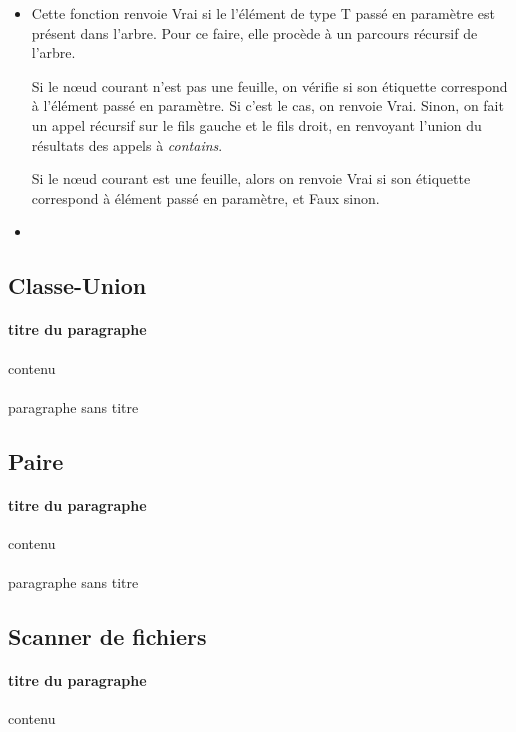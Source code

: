 \documentclass[a4paper]{article}
\begin{document}
		\begin{itemize}
			\item[$contains(T~elt) : booleen$] Cette fonction renvoie Vrai si le l'élément de type T passé en paramètre est présent dans l'arbre. Pour ce faire, elle procède à un parcours récursif de l'arbre. 
			
			Si le nœud courant n'est pas une feuille, on vérifie si son étiquette correspond à l'élément passé en paramètre. Si c'est le cas, on renvoie Vrai. Sinon, on fait un appel récursif sur le fils gauche et le fils droit, en renvoyant l'union du résultats des appels à \textit{contains}.
			
			Si le nœud courant est une feuille, alors on renvoie Vrai si son étiquette correspond à élément passé en paramètre, et Faux sinon.
			\item[$]
		\end{itemize}
		
		\subsection{Classe-Union}
		\paragraph{titre du paragraphe}{contenu}
		\paragraph{}{paragraphe sans titre}	
		
		\subsection{Paire}
		\paragraph{titre du paragraphe}{contenu}
		\paragraph{}{paragraphe sans titre}	
		
		\subsection{Scanner de fichiers}
		\paragraph{titre du paragraphe}{contenu}
\end{document}
